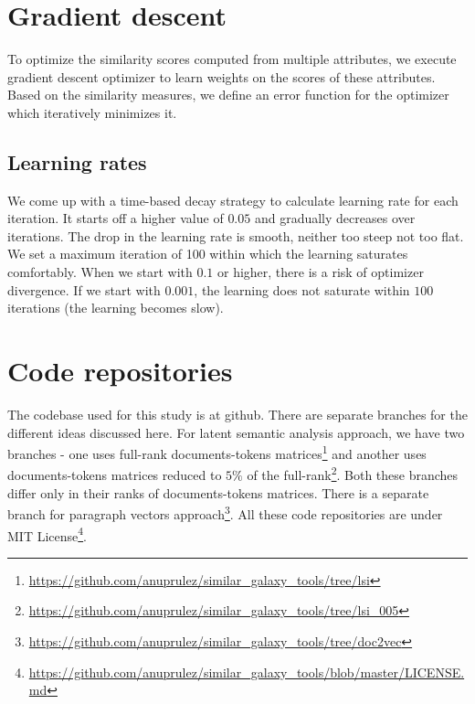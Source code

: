 \section{Gradient descent}
To optimize the similarity scores computed from multiple attributes, we execute gradient descent optimizer to learn weights on the scores of these attributes. Based on the similarity measures, we define an error function for the optimizer which iteratively minimizes it.

\subsection{Learning rates}
We come up with a time-based decay strategy to calculate learning rate for each iteration. It starts off a higher value of $0.05$ and gradually decreases over iterations. The drop in the learning rate is smooth, neither too steep not too flat. We set a maximum iteration of 100 within which the learning saturates comfortably. When we start with $0.1$ or higher, there is a risk of optimizer divergence. If we start with $0.001$, the learning does not saturate within $100$ iterations (the learning becomes slow). 

\section{Code repositories}
The codebase used for this study is at github. There are separate branches for the different ideas discussed here. For latent semantic analysis approach, we have two branches - one uses full-rank documents-tokens matrices\footnote{\url{https://github.com/anuprulez/similar_galaxy_tools/tree/lsi}} and another uses documents-tokens matrices reduced to $5\%$ of the full-rank\footnote{\url{https://github.com/anuprulez/similar_galaxy_tools/tree/lsi_005}}. Both these branches differ only in their ranks of documents-tokens matrices. There is a separate branch for paragraph vectors approach\footnote{\url{https://github.com/anuprulez/similar_galaxy_tools/tree/doc2vec}}. All these code repositories are under MIT License\footnote{\url{https://github.com/anuprulez/similar_galaxy_tools/blob/master/LICENSE.md}}.